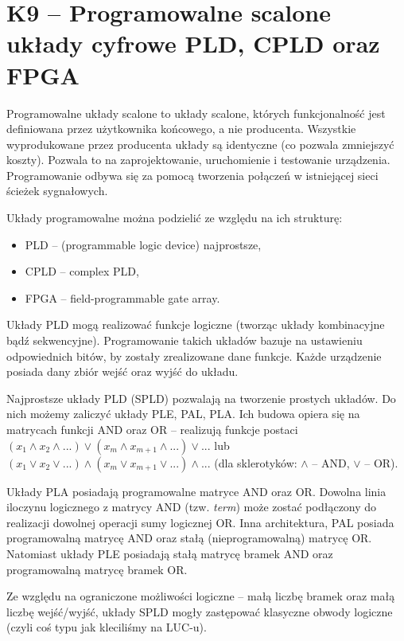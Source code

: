 \section{K9 -- Programowalne scalone układy cyfrowe PLD, CPLD oraz FPGA}

Programowalne układy scalone to układy scalone, których funkcjonalność jest definiowana przez użytkownika końcowego, a nie producenta. Wszystkie wyprodukowane przez producenta układy są identyczne (co pozwala zmniejszyć koszty). Pozwala to na zaprojektowanie, uruchomienie i testowanie urządzenia. Programowanie odbywa się za pomocą tworzenia połączeń w istniejącej sieci ścieżek sygnałowych. 

Układy programowalne można podzielić ze względu na ich strukturę:
\begin{itemize}
	\setlength\itemsep{1pt}
	\item PLD -- (programmable logic device) najprostsze,
	\item CPLD -- complex PLD,
	\item FPGA -- field-programmable gate array.
\end{itemize}

Układy PLD mogą realizować funkcje logiczne (tworząc układy kombinacyjne bądź sekwencyjne). Programowanie takich układów bazuje na ustawieniu odpowiednich bitów, by zostały zrealizowane dane funkcje. Każde urządzenie posiada dany zbiór wejść oraz wyjść do układu.

Najprostsze układy PLD (SPLD) pozwalają na tworzenie prostych układów. Do nich możemy zaliczyć układy PLE, PAL, PLA. Ich budowa opiera się na matrycach funkcji AND oraz OR -- realizują funkcje postaci $(x_{1} \wedge x_{2} \wedge ...) \vee (x_{m} \wedge x_{m+1} \wedge ...) \vee ...$ lub $(x_{1} \vee x_{2} \vee ...) \wedge (x_{m} \vee x_{m+1} \vee ...) \wedge ...$ (dla sklerotyków: $\wedge$ -- AND, $\vee$ -- OR). 

Układy PLA posiadają programowalne matryce AND oraz OR. Dowolna linia iloczynu logicznego z matrycy AND (tzw. \textit{term}) może zostać podłączony do realizacji dowolnej operacji sumy logicznej OR. Inna architektura, PAL posiada programowalną matrycę AND oraz stałą (nieprogramowalną) matrycę OR. Natomiast układy PLE posiadają stałą matrycę bramek AND oraz programowalną matrycę bramek OR.

Ze względu na ograniczone możliwości logiczne -- małą liczbę bramek oraz małą liczbę wejść/wyjść, układy SPLD mogły zastępować klasyczne obwody logiczne (czyli coś typu jak kleciliśmy na LUC-u).

